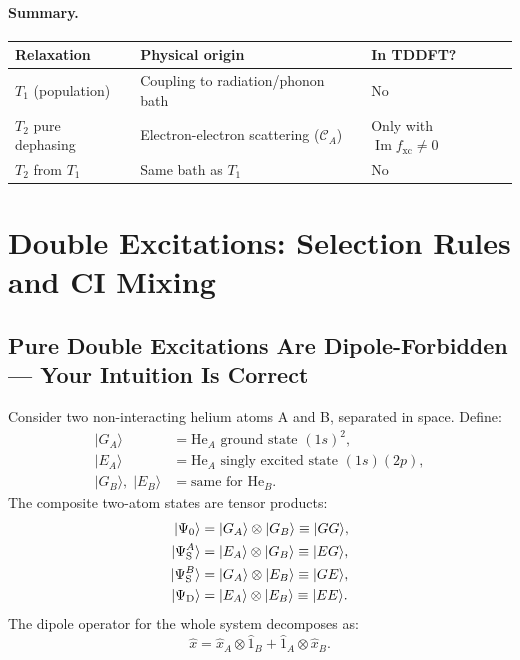 \documentclass[12pt,letterpaper]{article}
\newcommand{\fxc}{f_{\mathrm{xc}}}
\theoremstyle{definition}
\begin{document}
\paragraph{Summary.}
\begin{center}
\begin{tabular}{@{}lll@{}}
\toprule
Relaxation & Physical origin & In TDDFT? \\
\midrule
$T_1$ (population) & Coupling to radiation/phonon bath & No \\
$T_2$ pure dephasing & Electron-electron scattering ($\mathcal{C}_A$) & Only with $\operatorname{Im}\fxc\neq 0$ \\
$T_2$ from $T_1$ & Same bath as $T_1$ & No \\
\bottomrule
\end{tabular}
\end{center}

\section{Double Excitations: Selection Rules and CI Mixing}
\label{sec:doubles}

\subsection{Pure Double Excitations Are Dipole-Forbidden --- Your Intuition Is Correct}

Consider two non-interacting helium atoms A and B, separated in space.
Define:
\begin{align*}
  |G_A\rangle &= \text{He}_A \text{ ground state } (1s)^2, \\
  |E_A\rangle &= \text{He}_A \text{ singly excited state } (1s)(2p), \\
  |G_B\rangle,\;|E_B\rangle &= \text{same for He}_B.
\end{align*}
The composite two-atom states are tensor products:
\begin{align*}
  |\Psi_0\rangle &= |G_A\rangle\otimes|G_B\rangle \equiv |GG\rangle, \\
  |\Psi_{\rm S}^A\rangle &= |E_A\rangle\otimes|G_B\rangle \equiv |EG\rangle, \\
  |\Psi_{\rm S}^B\rangle &= |G_A\rangle\otimes|E_B\rangle \equiv |GE\rangle, \\
  |\Psi_{\rm D}\rangle &= |E_A\rangle\otimes|E_B\rangle \equiv |EE\rangle.
\end{align*}
The dipole operator for the whole system decomposes as:
\begin{equation}
  \hat{x} = \hat{x}_A\otimes\hat{1}_B + \hat{1}_A\otimes\hat{x}_B.
  \label{eq:dipole_total}
\end{equation}
\end{document}
